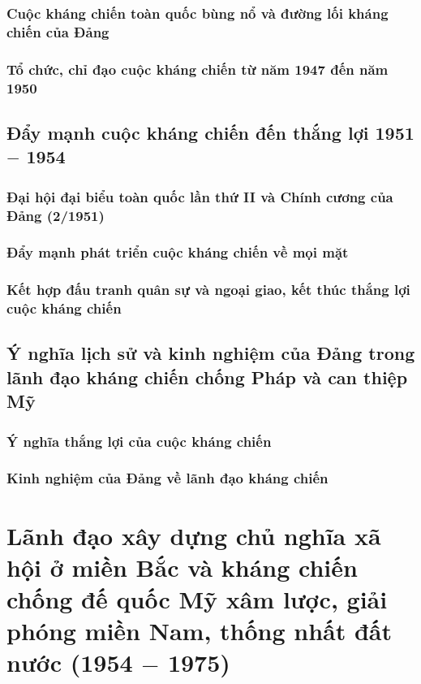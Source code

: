 \subsubsection{Cuộc kháng chiến toàn quốc bùng nổ và đường lối kháng chiến của Đảng}
\subsubsection{Tổ chức, chỉ đạo cuộc kháng chiến từ năm 1947 đến năm 1950}

\subsection{Đẩy mạnh cuộc kháng chiến đến thắng lợi 1951 $-$ 1954}
\subsubsection{Đại hội đại biểu toàn quốc lần thứ II và Chính cương của Đảng (2/1951)}
\subsubsection{Đẩy mạnh phát triển cuộc kháng chiến về mọi mặt}
\subsubsection{Kết hợp đấu tranh quân sự và ngoại giao, kết thúc thắng lợi cuộc kháng chiến}

\subsection{Ý nghĩa lịch sử và kinh nghiệm của Đảng trong lãnh đạo kháng chiến chống Pháp và can thiệp Mỹ}
\subsubsection{Ý nghĩa thắng lợi của cuộc kháng chiến}
\subsubsection{Kinh nghiệm của Đảng về lãnh đạo kháng chiến}

\section{Lãnh đạo xây dựng chủ nghĩa xã hội ở miền Bắc và kháng chiến chống đế quốc Mỹ xâm lược, giải phóng miền Nam, thống nhất đất nước (1954 $-$ 1975)}

